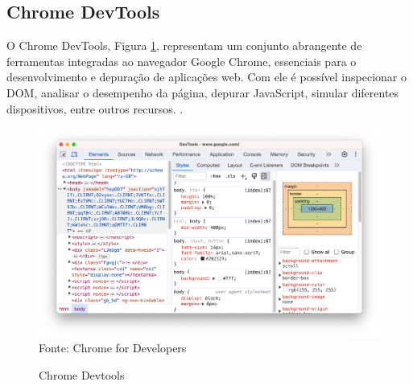 \subsection{Chrome DevTools}
O Chrome DevTools, Figura \ref{fig:chrome-devtools}, representam um conjunto abrangente de ferramentas integradas ao navegador Google Chrome, essenciais para o desenvolvimento e depuração de aplicações web. Com ele é possível inspecionar o DOM, analisar o desempenho da página, depurar JavaScript, simular diferentes dispositivos, entre outros recursos. \cite{chrome}.
\begin{figure}[!htb]
    \centering
    \caption{Chrome Devtools}
    \includegraphics[width=0.65 \linewidth]{../figuras/chrome-devtools.png}\\
    {\footnotesize Fonte: Chrome for Developers}
    \label{fig:chrome-devtools}
\end{figure}
\newpage

